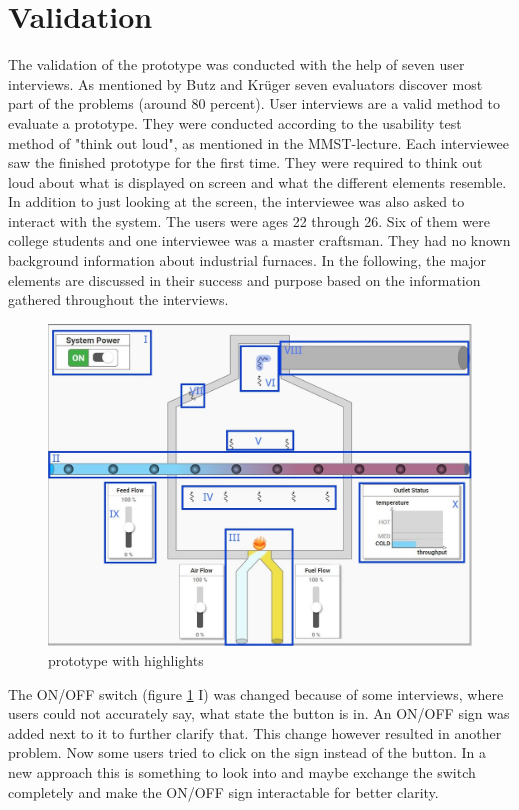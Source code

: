 \section*{Validation}

The validation of the prototype was conducted with the help of seven user interviews. As mentioned by Butz and Krüger \cite{ButzKrueger2017} seven evaluators discover most part of the problems (around 80 percent). User interviews are a valid method to evaluate a prototype. They were conducted according to the usability test method of "think out loud", as mentioned in the \ac{MMST}-lecture. Each interviewee saw the finished prototype for the first time. They were required to think out loud about what is displayed on screen and what the different elements resemble. In addition to just looking at the screen, the interviewee was also asked to interact with the system. The users were ages 22 through 26. Six of them were college students and one interviewee was a master craftsman. They had no known background information about industrial furnaces. In the following, the major elements are discussed in their success and purpose based on the information gathered throughout the interviews. 

\begin{figure}[htp]
    \centering
    \includegraphics[width=0.7\linewidth]{images/concept/prototype/prototype_final_ref.jpg}
    \caption{prototype with highlights}
\label{fig:final_prototype_ref}
\end{figure}

The ON/OFF switch (figure \ref{fig:final_prototype_ref} I) was changed because of some interviews, where users could not accurately say, what state the button is in. An ON/OFF sign was added next to it to further clarify that. This change however resulted in another problem. Now some users tried to click on the sign instead of the button. In a new approach this is something to look into and maybe exchange the switch completely and make the ON/OFF sign interactable for better clarity.


